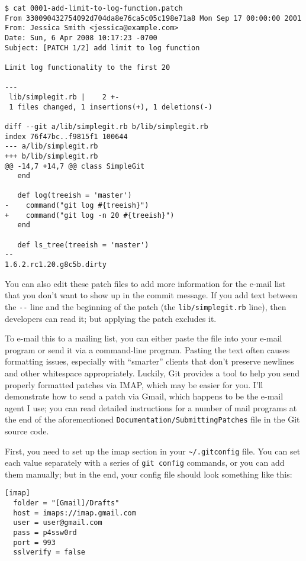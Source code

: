 \documentclass[a4paper]{book}
\begin{document}
\begin{shaded}\begin{verbatim}
$ cat 0001-add-limit-to-log-function.patch
From 330090432754092d704da8e76ca5c05c198e71a8 Mon Sep 17 00:00:00 2001
From: Jessica Smith <jessica@example.com>
Date: Sun, 6 Apr 2008 10:17:23 -0700
Subject: [PATCH 1/2] add limit to log function

Limit log functionality to the first 20

---
 lib/simplegit.rb |    2 +-
 1 files changed, 1 insertions(+), 1 deletions(-)

diff --git a/lib/simplegit.rb b/lib/simplegit.rb
index 76f47bc..f9815f1 100644
--- a/lib/simplegit.rb
+++ b/lib/simplegit.rb
@@ -14,7 +14,7 @@ class SimpleGit
   end

   def log(treeish = 'master')
-    command("git log #{treeish}")
+    command("git log -n 20 #{treeish}")
   end

   def ls_tree(treeish = 'master')
--
1.6.2.rc1.20.g8c5b.dirty
\end{verbatim}\end{shaded}

You can also edit these patch files to add more information for the e-mail list that you don't want to show up in the commit message. If you add text between the \texttt{-{}-} line and the beginning of the patch (the \texttt{lib/simplegit.rb} line), then developers can read it; but applying the patch excludes it.

To e-mail this to a mailing list, you can either paste the file into your e-mail program or send it via a command-line program. Pasting the text often causes formatting issues, especially with “smarter” clients that don't preserve newlines and other whitespace appropriately. Luckily, Git provides a tool to help you send properly formatted patches via IMAP, which may be easier for you. I'll demonstrate how to send a patch via Gmail, which happens to be the e-mail agent I use; you can read detailed instructions for a number of mail programs at the end of the aforementioned \texttt{Documentation/SubmittingPatches} file in the Git source code.

First, you need to set up the imap section in your \texttt{\textasciitilde{}/.gitconfig} file. You can set each value separately with a series of \texttt{git config} commands, or you can add them manually; but in the end, your config file should look something like this:

\begin{shaded}\begin{verbatim}
[imap]
  folder = "[Gmail]/Drafts"
  host = imaps://imap.gmail.com
  user = user@gmail.com
  pass = p4ssw0rd
  port = 993
  sslverify = false
\end{verbatim}\end{shaded}
\end{document}
